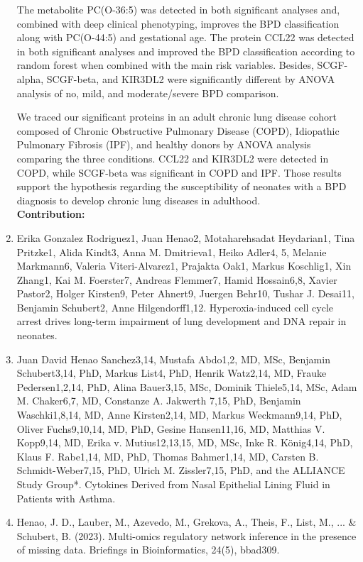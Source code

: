 \begin{enumerate}
The metabolite PC(O-36:5) was detected in both significant analyses and, combined with deep clinical phenotyping, improves the BPD classification along with PC(O-44:5) and gestational age. The protein CCL22 was detected in both significant analyses and improved the BPD classification according to random forest when combined with the main risk variables. Besides, SCGF-alpha, SCGF-beta, and KIR3DL2 were significantly different by ANOVA analysis of no, mild, and moderate/severe BPD comparison.

We traced our significant proteins in an adult chronic lung disease cohort composed of Chronic Obstructive Pulmonary Disease (COPD), Idiopathic Pulmonary Fibrosis (IPF), and healthy donors by ANOVA analysis comparing the three conditions. CCL22 and KIR3DL2 were detected in COPD, while SCGF-beta was significant in COPD and IPF. Those results support the hypothesis regarding the susceptibility of neonates with a BPD diagnosis to develop chronic lung diseases in adulthood.\\

	\textbf{Contribution:} 
	
	\item Erika Gonzalez Rodriguez1, Juan Henao2, Motaharehsadat Heydarian1, Tina Pritzke1, Alida Kindt3, Anna M. Dmitrieva1, Heiko Adler4, 5, Melanie Markmann6, Valeria Viteri-Alvarez1, Prajakta Oak1, Markus Koschlig1, Xin Zhang1, Kai M. Foerster7, Andreas Flemmer7, Hamid Hossain6,8, Xavier Pastor2, Holger Kirsten9, Peter Ahnert9, Juergen Behr10, Tushar J. Desai11, Benjamin Schubert2, Anne Hilgendorff1,12. Hyperoxia-induced cell cycle arrest drives long-term impairment of lung development and DNA repair in neonates.
	
	\item 	Juan David Henao Sanchez3,14, Mustafa Abdo1,2, MD, MSc, Benjamin Schubert3,14, PhD, Markus List4, PhD, Henrik Watz2,14, MD, Frauke Pedersen1,2,14, PhD, Alina Bauer3,15, MSc, Dominik Thiele5,14, MSc, Adam M. Chaker6,7, MD, Constanze A. Jakwerth 7,15, PhD, Benjamin Waschki1,8,14, MD, Anne Kirsten2,14, MD, Markus Weckmann9,14, PhD, Oliver Fuchs9,10,14, MD, PhD, Gesine Hansen11,16, MD, Matthias V. Kopp9,14, MD, Erika v. Mutius12,13,15, MD, MSc, Inke R. König4,14, PhD, Klaus F.  Rabe1,14, MD, PhD, Thomas Bahmer1,14, MD, Carsten B. Schmidt-Weber7,15, PhD, Ulrich M. Zissler7,15, PhD, and the ALLIANCE Study Group*. Cytokines Derived from Nasal Epithelial Lining Fluid in Patients with Asthma.
	
	\item Henao, J. D., Lauber, M., Azevedo, M., Grekova, A., Theis, F., List, M., ... \& Schubert, B. (2023). Multi-omics regulatory network inference in the presence of missing data. Briefings in Bioinformatics, 24(5), bbad309. 
\end{enumerate}